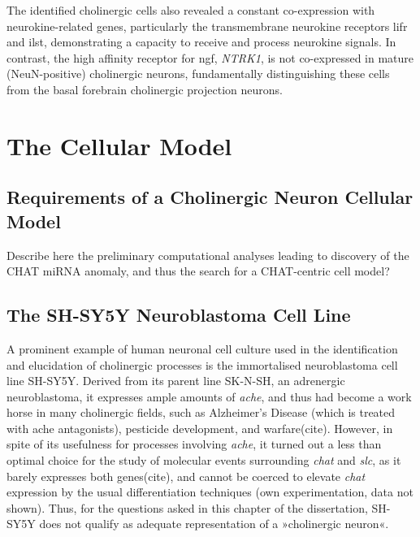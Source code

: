 The identified cholinergic cells also revealed a constant co-expression with neurokine-related genes, particularly the transmembrane neurokine receptors \ac{lifr} and \ac{ilst}, demonstrating a capacity to receive and process neurokine signals. In contrast, the high affinity receptor for \ac{ngf}, \textit{NTRK1}, is not co-expressed in mature (NeuN-positive) cholinergic neurons, fundamentally distinguishing these cells from the basal forebrain cholinergic projection neurons.

\section{The Cellular Model}
\subsection{Requirements of a Cholinergic Neuron Cellular Model} \label{sec:cellculture:model}
Describe here the preliminary computational analyses leading to discovery of the CHAT miRNA anomaly, and thus the search for a CHAT-centric cell model? 
\subsection{The SH-SY5Y Neuroblastoma Cell Line}
A prominent example of human neuronal cell culture used in the identification and elucidation of cholinergic processes is the immortalised neuroblastoma cell line SH-SY5Y\cite{Biedler1978}. Derived from its parent line SK-N-SH, an adrenergic neuroblastoma\cite{Biedler1973}, it expresses ample amounts of \textit{\ac{ache}}, and thus had become a work horse in many cholinergic fields, such as Alzheimer's Disease (which is treated with \ac{ache} antagonists), pesticide development, and warfare(cite). However, in spite of its usefulness for processes involving \textit{\ac{ache}}, it turned out a less than optimal choice for the study of molecular events surrounding \textit{\ac{chat}} and \textit{\ac{slc}}, as it barely expresses both genes(cite), and cannot be coerced to elevate \textit{\ac{chat}} expression by the usual differentiation techniques (own experimentation, data not shown). Thus, for the questions asked in this chapter of the dissertation, SH-SY5Y does not qualify as adequate representation of a »cholinergic neuron«.

